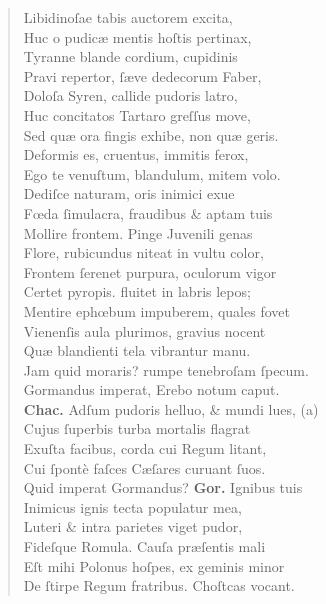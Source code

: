 \documentclass[a4paper,12pt]{article}
\begin{document}
\begin{verse}
Libidinoſae tabis auctorem excita,\\[0pt]
Huc o pudicæ mentis hoſtis pertinax,\\[0pt]
Tyranne blande cordium, cupidinis\\[0pt]
Pravi repertor, ſæve dedecorum Faber,\\[0pt]
Doloſa Syren, callide pudoris latro,\\[0pt]
Huc concitatos Tartaro greſſus move,\\[0pt]
Sed quæ ora fingis exhibe, non quæ geris.\\[0pt]
Deformis es, cruentus, immitis ferox,\\[0pt]
Ego te venuſtum, blandulum, mitem volo.\\[0pt]
Dediſce naturam, oris inimici exue\\[0pt]
Fœda ſimulacra, fraudibus \& aptam tuis\\[0pt]
Mollire frontem. Pinge Juvenili genas\\[0pt]
Flore, rubicundus niteat in vultu color,\\[0pt]
Frontem ſerenet purpura, oculorum vigor\\[0pt]
Certet pyropis. fluitet in labris lepos;\\[0pt]
Mentire ephœbum impuberem, quales fovet\\[0pt]
Vienenſis aula plurimos, gravius nocent\\[0pt]
Quæ blandienti tela vibrantur manu.\\[0pt]
Jam quid moraris? rumpe tenebroſam ſpecum.\\[0pt]
Gormandus imperat, Erebo notum caput.\\[0pt]
\textbf{Chac.} Adſum pudoris helluo, \& mundi lues, (a)\footnotemark\\[0pt]
Cujus ſuperbis turba mortalis flagrat\\[0pt]
Exuſta facibus, corda cui Regum litant,\\[0pt]
Cui ſpontè faſces Cæſares curuant ſuos.\\[0pt]
Quid imperat Gormandus? \textbf{Gor.} Ignibus tuis\\[0pt]
Inimicus ignis tecta populatur mea,\\[0pt]
Luteri \& intra parietes viget pudor,\\[0pt]
Fideſque Romula. Cauſa præſentis mali\\[0pt]
Eſt mihi Polonus hoſpes, ex geminis minor\\[0pt]
De ſtirpe Regum fratribus. Choſtcas vocant.\\[0pt]

\end{verse}
\end{document}
